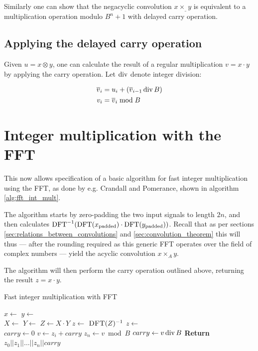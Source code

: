 Similarly one can show that the negacyclic convolution $x \times_{\_} y$ is
equivalent to a multiplication operation modulo $B^n + 1$ with delayed carry
operation.

\subsection{Applying the delayed carry operation}

Given $u = x \otimes y$, one can calculate the result of a regular
multiplication $v = x \cdot y$ by applying the carry operation. Let
$\operatorname{div}$ denote integer division:

\begin{align*}
		\overline{v}_i & = u_i + (\overline{v}_{i-1} \operatorname{div} B) \\
		v_i & = \overline{v}_i \bmod B
\end{align*}

\section{Integer multiplication with the FFT}

This now allows specification of a basic algorithm for fast integer
multiplication using the FFT, as done by e.g. Crandall and Pomerance, shown in
algorithm \ref{alg:fft_int_mult}.\autocite{crandallPrimeNumbersComputational2005}

The algorithm starts by zero-padding the two input signals to length $2n$, and
then calculates $\operatorname{DFT}^{-1}(\operatorname{DFT}(x_{\text{padded}}) \cdot
\operatorname{DFT}(y_{\text{padded}}))$.  Recall that as per sections
\ref{sec:relations_between_convolutions} and \ref{sec:convolution_theorem} this
will thus --- after the rounding required as this generic FFT operates over the
field of complex numbers --- yield the acyclic convolution $x \times_A y$.

The algorithm will then perform the carry operation outlined above, returning
the result $z = x \cdot y$.

\begin{algorithm}
		\caption{Fast integer multiplication with FFT}
		\begin{algorithmic}[1]
				\State $x \gets$  
				\State $y \gets$ 
				\\
				\State $X \gets$ 
				\State $Y \gets$ 
				\State $Z \gets X \cdot Y$ 
				\State $z \gets$ $\Call{DFT}{Z}^{-1}$
				\State $z \gets$ 
				\\
				\State $carry \gets 0$
				\State $v \gets z_i + carry$
				\State $z_n \gets v \bmod B$
				\State $carry \gets v \operatorname{div} B$
				\EndFor
				\State \textbf{Return} $z_0 || z_1 || \ldots || z_n || carry$
				\\
				\EndFunction
		\end{algorithmic}
		\label{alg:fft_int_mult}
\end{algorithm}

